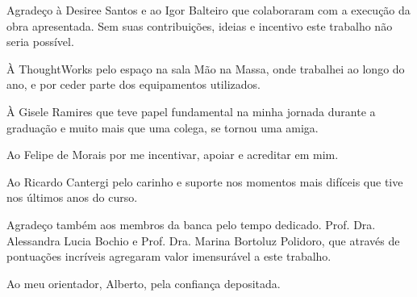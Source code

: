 \begin{agradecimento}

Agradeço à Desiree Santos e ao Igor Balteiro que colaboraram com a execução da obra apresentada. Sem suas contribuições, ideias e incentivo este trabalho não seria possível. 

À ThoughtWorks pelo espaço na sala Mão na Massa, onde trabalhei ao longo do ano, e por ceder parte dos equipamentos utilizados.

À Gisele Ramires que teve papel fundamental na minha jornada durante a graduação e muito mais que uma colega, se tornou uma amiga. 

Ao Felipe de Morais por me incentivar, apoiar e acreditar em mim. 

Ao Ricardo Cantergi pelo carinho e suporte nos momentos mais difíceis que tive nos últimos anos do curso. 

Agradeço também aos membros da banca pelo tempo dedicado. Prof. Dra. Alessandra Lucia Bochio e Prof. Dra. Marina Bortoluz Polidoro, que através de pontuações incríveis agregaram valor imensurável a este trabalho.

Ao meu orientador, Alberto, pela confiança depositada.

\end{agradecimento}